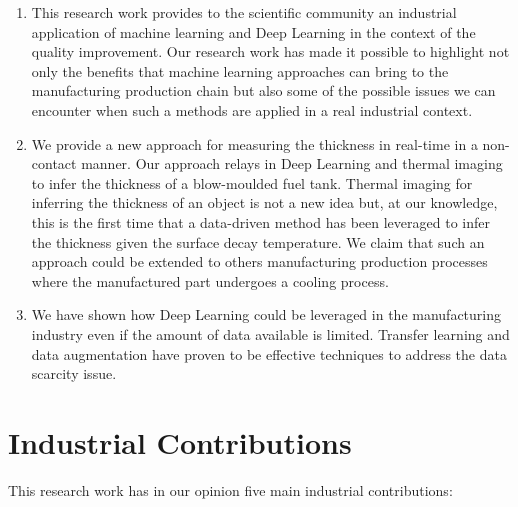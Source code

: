 \begin{enumerate}
    \item This research work provides to the scientific community an industrial application of machine learning and Deep Learning in the context of the quality improvement. Our research work has made it possible to highlight not only the benefits that machine learning approaches can bring to the manufacturing production chain but also some of the possible issues we can encounter when such a methods are applied in a real industrial context. 
    
    \item We provide a new approach for measuring the thickness in real-time in a non-contact manner. Our approach relays in Deep Learning and thermal imaging to infer the thickness of a blow-moulded fuel tank. Thermal imaging for inferring the thickness of an object is not a new idea but, at our knowledge, this is the first time that a data-driven method has been leveraged to infer the thickness given the surface decay temperature. We claim that such an approach could be extended to others manufacturing production processes where the manufactured part undergoes a cooling process.    
    
    \item We have shown how Deep Learning could be leveraged in the manufacturing industry even if the amount of data available is limited. Transfer learning and data augmentation have proven to be effective techniques to address the data scarcity issue.  

\end{enumerate}


\section*{Industrial Contributions}

This research work has in our opinion five main industrial contributions:

